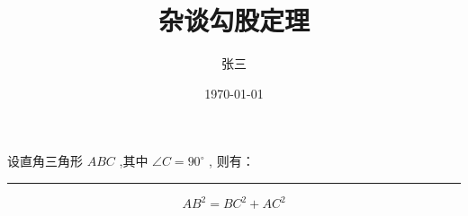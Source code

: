 \documentclass{book} %
\title{杂谈勾股定理}
\author{张三}
\date{\today}
\newcommand\degree{^\circ} %
\begin{document}
    \maketitle %

    设直角三角形 $ABC$ ,其中 $\angle C=90\degree$ , 则有：

\begin{center}
\rule{1.0\linewidth}{20\linethickness}{\color{red}}
\end{center}

    \begin{equation} %
        AB^2 = BC^2 + AC^2
    \end{equation}
\end{document}
